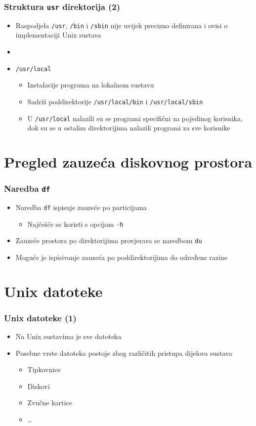 \documentclass{beamer}
\begin{document}
\begin{frame}[t]
\frametitle{Struktura \texttt{usr} direktorija (2)}
\begin{itemize}
  \item Raspodjela \texttt{/usr}, \texttt{/bin} i \texttt{/sbin} nije uvijek
        precizno definirana i ovisi o implementaciji Unix sustava
  \item[]
  \item[] \texttt{/usr/local}
  \begin{itemize}
    \item Instalacije programa na lokalnom sustavu
    \item Sadrži poddirektorije \texttt{/usr/local/bin} i
          \texttt{/usr/local/sbin}
    \item U \texttt{/usr/local} nalazili su se programi specifični za
          pojedinog korisnika, dok su se u ostalim direktorijima nalazili
          programi za sve korisnike
  \end{itemize}
\end{itemize}
\end{frame}

\section{Pregled zauzeća diskovnog prostora}
\begin{frame}[t]
\frametitle{Naredba \texttt{df}}
\begin{itemize}
  \item Naredba \texttt{df} ispisuje zauzeće po particijama
  \begin{itemize}
    \item Najčešće se koristi s opcijom \texttt{-h}
  \end{itemize}
  \item Zauzeće prostora po direktorijima provjerava se naredbom
        \texttt{du}
  \item Moguće je ispisivanje zauzeća po poddirektorijima do određene
        razine
\end{itemize}
\end{frame}

\section{Unix datoteke}
\begin{frame}[t]
\frametitle{Unix datoteke (1)}
\begin{itemize}
  \item Na Unix sustavima je sve datoteka
  \item Posebne vrste datoteka postoje zbog različitih pristupa dijelova
        sustava
  \begin{itemize}
    \item Tipkovnice
    \item Diskovi
    \item Zvučne kartice
    \item \ldots
  \end{itemize}
\end{itemize}
\end{frame}
\end{document}
